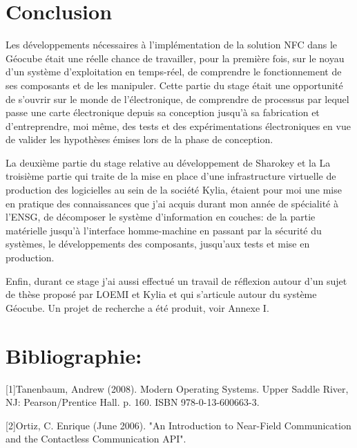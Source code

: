 \documentclass{themeensg}
\begin{document}
\newevenpage
\chapter*{Conclusion}
  \vspace{1.5cm}

Les développements nécessaires à l'implémentation de la solution NFC dans le Géocube était une réelle chance de travailler, pour la première fois, sur le noyau d'un système d'exploitation en temps-réel, de comprendre le fonctionnement de ses composants et de les manipuler. Cette partie du stage était une opportunité de s'ouvrir sur le monde de l'électronique, de comprendre de processus par lequel passe une carte électronique depuis sa conception jusqu'à sa fabrication et d'entreprendre, moi même, des tests et des expérimentations électroniques en vue de valider les hypothèses émises lors de la phase de conception.

La deuxième partie du stage relative au développement de Sharokey et la La troisième partie qui traite de la mise en place d'une infrastructure virtuelle de production des logicielles au sein de la société Kylia, étaient pour moi une mise en pratique des connaissances que j'ai acquis durant mon année de spécialité à l'ENSG, de décomposer le système d'information en couches: de la partie matérielle jusqu'à l'interface homme-machine en passant par la sécurité du systèmes, le développements des composants, jusqu'aux tests et mise en production.

Enfin, durant ce stage j'ai aussi effectué un travail de réflexion autour d'un sujet de thèse proposé par LOEMI et Kylia et qui s'articule autour du système Géocube. Un projet de recherche a été produit, voir Annexe I.

\newevenpage
\chapter*{Bibliographie:}
  \vspace{1.5cm}

[1]Tanenbaum, Andrew (2008). Modern Operating Systems. Upper Saddle River, NJ: Pearson/Prentice Hall. p. 160. ISBN 978-0-13-600663-3.

[2]Ortiz, C. Enrique (June 2006). "An Introduction to Near-Field Communication and the Contactless Communication API".
\end{document}
